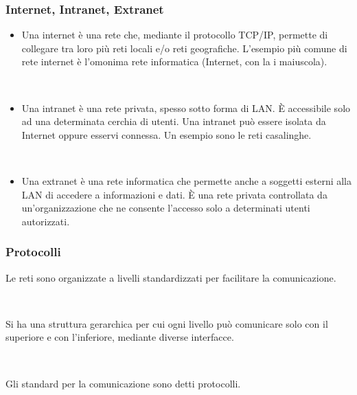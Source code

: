 \documentclass[]{beamer}
\begin{document}
\begin{frame}
\frametitle{Internet, Intranet, Extranet}
\begin{itemize}
  \item Una \alert<1->{internet} è una rete che, mediante il protocollo TCP/IP, permette di collegare tra loro più reti locali e/o reti geografiche. L’esempio più comune di rete internet è l’omonima rete informatica (Internet, con la i maiuscola).\pause
  
  ~

  \item Una \alert<2->{intranet} è una rete privata, spesso sotto forma di LAN. È accessibile solo ad una determinata cerchia di utenti. Una intranet può essere isolata da Internet oppure esservi connessa. Un esempio sono le reti casalinghe.\pause
  
  ~

  \item Una \alert<3>{extranet} è una rete informatica che permette anche a soggetti esterni alla LAN di accedere a informazioni e dati. È una rete privata controllata da un'organizzazione che ne consente l’accesso solo a determinati utenti autorizzati.
\end{itemize}
\end{frame}



\begin{frame}
\frametitle{Protocolli}
Le reti sono organizzate a \alert<1>{livelli} standardizzati per facilitare la comunicazione.\pause

~

Si ha una \alert<2>{struttura gerarchica} per cui ogni livello può comunicare solo con il superiore e con l’inferiore, mediante diverse interfacce.\pause

~

Gli standard per la comunicazione sono detti \alert<3>{protocolli}.
\end{frame}
\end{document}
